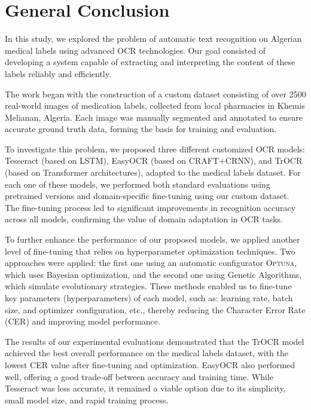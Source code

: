 \chapter*{General Conclusion}

In this study, we explored the problem of automatic text recognition on Algerian medical labels using advanced OCR technologies. Our goal consisted of developing a system capable of extracting and interpreting the content of these labels reliably and efficiently.%

The work began with the construction of a custom dataset consisting of over 2500 real-world images of medication labels, collected from local pharmacies in Khemis Melianan, Algeria. Each image was manually segmented and annotated to ensure accurate ground truth data, forming the basis for training and evaluation. 

To investigate this problem, we proposed three different customized OCR models: Tesseract (based on LSTM), EasyOCR (based on CRAFT+CRNN), and TrOCR (based on Transformer architectures), adapted to the medical labels dataset. For each one of these models, we performed both standard evaluations using pretrained versions and domain-specific fine-tuning using our custom dataset. The fine-tuning process led to significant improvements in recognition accuracy across all models, confirming the value of domain adaptation in OCR tasks.

To further enhance the performance of our proposed models, we applied another level of fine-tuning that relies on hyperparameter optimization techniques. Two approaches were applied: the first one using an automatic configurator \textsc{Optuna}, which uses Bayesian optimization, and the second one using Genetic Algorithms, which simulate evolutionary strategies. These methods enabled us to fine-tune key parameters (hyperparameters) of each model, such as: learning rate, batch size, and optimizer configuration, etc., thereby reducing the Character Error Rate (CER) and improving model performance.

The results of our experimental evaluations demonstrated that the TrOCR model achieved the best overall performance on the medical labels dataset, with the lowest CER value after fine-tuning and optimization. EasyOCR also performed well, offering a good trade-off between accuracy and training time. While Tesseract was less accurate, it remained a viable option due to its simplicity, small model size, and rapid training process.

